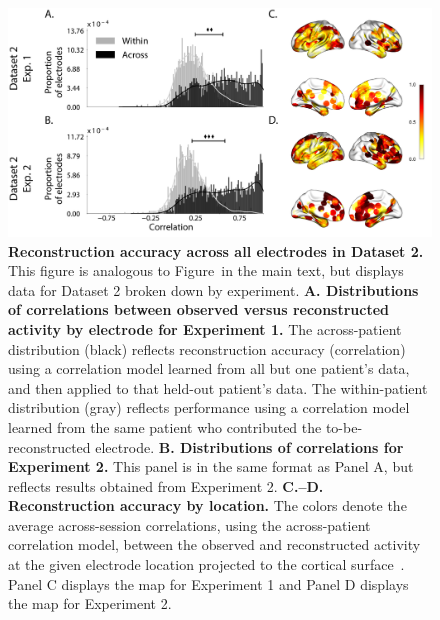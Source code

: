 \documentclass[10pt]{article}
\begin{document}
\begin{figure}[p]
\centering \includegraphics[width=\textwidth]{figs/supplemental_3}
\caption{\textbf{Reconstruction accuracy across all electrodes in Dataset 2.}
This figure is analogous to Figure~\corrmaps in the main text, but displays data
for Dataset 2 broken down by experiment. \textbf{A. Distributions of
correlations between observed versus reconstructed activity by electrode for
Experiment 1.}  The across-patient distribution (black) reflects reconstruction
accuracy (correlation) using a correlation model learned from all but one
patient's data, and then applied to that held-out patient's data.  The
within-patient distribution (gray) reflects performance using a correlation
model learned from the same patient who contributed the to-be-reconstructed
electrode. \textbf{B. Distributions of correlations for Experiment 2.}  This
panel is in the same format as Panel A, but reflects results obtained from
Experiment 2. \textbf{C.--D. Reconstruction accuracy by location.} The colors
denote the average across-session correlations, using the across-patient
correlation model, between the observed and reconstructed activity at the given
electrode location projected to the cortical surface~\citep{CombEtal19}.  Panel
C displays the map for Experiment 1 and Panel D displays the map for Experiment 2.}
\label{fig:supplemental_3}
\end{figure}
\end{document}
